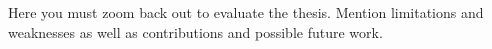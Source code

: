 \documentclass[a4paper,12pt]{Classes/RoboticsLaTeX}
\begin{document}
	
	Here you must zoom back out to evaluate the thesis. Mention limitations and weaknesses as well as contributions and possible future work.
	
	 
	\renewcommand{\bibname}{References}           %
	
	
	
	
\end{document}
